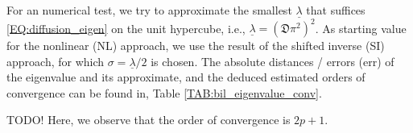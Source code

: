 \documentclass[a4paper, english, 12pt, reqno, draft]{amsart}
\theoremstyle{definition}
\theoremstyle{remark}
\numberwithin{equation}{section}
\newcommand{\setEdge}{\ensuremath{\mathcal E}}
\newcommand{\setNode}{\ensuremath{\mathcal N}}
\newcommand{\setNodeDir}{\ensuremath{\setNode_\textup D}}
\newcommand{\setNodeBar}{\ensuremath{\bar{\mathcal N}}}
\newcommand{\setNodeDirBar}{\ensuremath{\setNodeBar_\textup D}}
\newcommand{\edge}{\ensuremath{E}}
\newcommand{\node}{\ensuremath{N}}
\newcommand{\Edge}{{\ensuremath{\boldsymbol E}}}
\newcommand{\Node}{{\ensuremath{\boldsymbol N}}}
\newcommand{\globDim}{\ensuremath{\mathfrak D}}
\newcommand{\Normal}{\ensuremath{\mathfrak n_\Edge}}
\renewcommand{\vec}[1]{\ensuremath{\boldsymbol{#1}}}
\newcommand{\ds}{\ensuremath{\, \textup d \sigma}}
\newcommand{\localU}{\ensuremath{\mathcal U}}
\newcommand{\localQ}{\ensuremath{\vec{\mathcal Q}}}
\newcommand{\mass}{\ensuremath{\mathfrak m}}
\newcommand{\eigenval}{\ensuremath{\underline \lambda}}
\begin{document}
% 
For an numerical test, we try to approximate the smallest $\eigenval$ that suffices \eqref{EQ:diffusion_eigen} on the unit hypercube, i.e., $\eigenval = (\globDim \pi^2)^2$. As starting value for the nonlinear (NL) approach, we use the result of the shifted inverse (SI) approach, for which $\sigma = \eigenval / 2$ is chosen. The absolute distances / errors (err) of the eigenvalue and its approximate, and the deduced estimated orders of convergence can be found in, Table \ref{TAB:bil_eigenvalue_conv}. \begin{envarerror}{TODO!} Here, we observe that the order of convergence is $2p+1$. \end{envarerror}
% 
\end{document}
